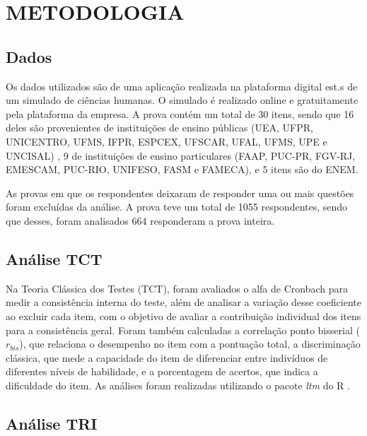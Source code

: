 \chapter{METODOLOGIA}

\section{Dados}

Os dados utilizados são  de uma aplicação realizada na plataforma digital est.s de um simulado de ciências humanas. O simulado é realizado online e gratuitamente pela plataforma da empresa. 
A prova contém um total de 30 itens, sendo que 16 deles são provenientes de instituições de ensino públicas (UEA, UFPR, UNICENTRO, UFMS, IFPR, ESPCEX, UFSCAR, UFAL, UFMS, UPE e UNCISAL) , 9 de instituições de ensino particulares (FAAP, PUC-PR, FGV-RJ, EMESCAM, PUC-RIO, UNIFESO, FASM e FAMECA), e 5 itens são do ENEM.


As provas em que os respondentes deixaram de responder uma ou mais questões foram excluídas da análise. A prova teve um total de 1055 respondentes, sendo que desses, foram analisados 664 responderam a prova inteira.



\section{Análise TCT}

Na Teoria Clássica dos Testes (TCT), foram avaliados o alfa de Cronbach para medir a consistência interna do teste, além de analisar a variação desse coeficiente ao excluir cada item, com o objetivo de avaliar a contribuição individual dos itens para a consistência geral. Foram também calculadas a correlação ponto bisserial ($r_{bis}$), que relaciona o desempenho no item com a pontuação total, a discriminação clássica, que mede a capacidade do item de diferenciar entre indivíduos de diferentes níveis de habilidade, e a porcentagem de acertos, que indica a dificuldade do item. As análises foram realizadas utilizando o pacote \textit{ltm} \cite{ltm} do R \cite{r}.



\section{Análise TRI}

